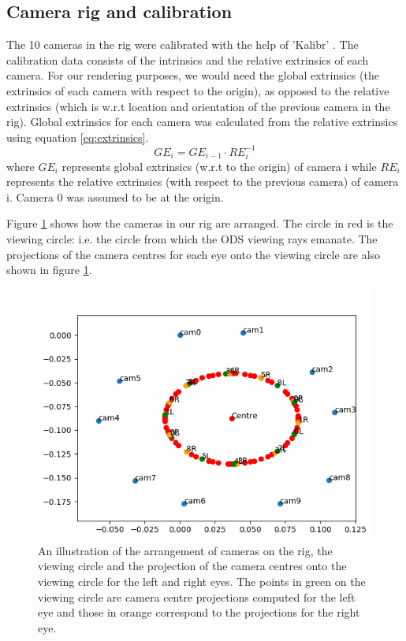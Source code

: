 \documentclass[10pt,twocolumn,letterpaper]{article}
\begin{document}
\subsection{Camera rig and calibration}
\label{sec:camera-rig}
The 10 cameras in the rig were calibrated with the help of 'Kalibr' \cite{kalibr}. The calibration data consists of the intrinsics and the relative extrinsics of each camera. For our rendering purposes, we would need the global extrinsics (the extrinsics of each camera with respect to the origin), as opposed to the relative extrinsics (which is w.r.t location and orientation of the previous camera in the rig). Global extrinsics for each camera was calculated from the relative extrinsics using equation \ref{eq:extrinsics}. 
\begin{equation}
GE_i = GE_{i-1} \cdot RE_{i}^{-1}
\label{eq:extrinsics}
\end{equation}
where $GE_i$ represents global extrinsics (w.r.t to the origin) of camera i while $RE_i$ represents the relative extrinsics (with respect to the previous camera) of camera i. Camera 0 was assumed to be at the origin.

Figure \ref{fig:rig} shows how the cameras in our rig are arranged. The circle in red is the viewing circle: i.e. the circle from which the ODS viewing rays emanate. The projections of the camera centres for each eye onto the viewing circle are also shown in figure \ref{fig:rig}. 

\begin{figure}[t]
\begin{center}
   \includegraphics[width=0.8\linewidth]{pictures/our_camera_rig.PNG}
\end{center}
   \caption{An illustration of the arrangement of cameras on the rig, the viewing circle and the projection of the camera centres onto the viewing circle for the left and right eyes. The points in green on the viewing circle are camera centre projections computed for the left eye and those in orange correspond to the projections for the right eye.}
\label{fig:rig}
\end{figure}
\end{document}

